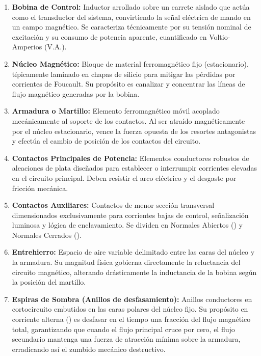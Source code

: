 \begin{enumerate}  
    \item\textbf{Bobina de Control:} Inductor arrollado sobre un carrete aislado que actúa como el transductor del sistema, convirtiendo la señal eléctrica de mando en un campo magnético. Se caracteriza técnicamente por su tensión nominal de excitación y su consumo de potencia aparente, cuantificado en Voltio-Amperios ($\text{V.A.}$).
    
    \item\textbf{Núcleo Magnético:} Bloque de material ferromagnético fijo (estacionario), típicamente laminado en chapas de silicio para mitigar las pérdidas por corrientes de Foucault. Su propósito es canalizar y concentrar las líneas de flujo magnético generadas por la bobina.
    
    \item\textbf{Armadura o Martillo:} Elemento ferromagnético móvil acoplado mecánicamente al soporte de los contactos. Al ser atraído magnéticamente por el núcleo estacionario, vence la fuerza opuesta de los resortes antagonistas y efectúa el cambio de posición de los contactos del circuito.
    
    \item\textbf{Contactos Principales de Potencia:} Elementos conductores robustos de aleaciones de plata diseñados para establecer o interrumpir corrientes elevadas en el circuito principal. Deben resistir el arco eléctrico y el desgaste por fricción mecánica.
    
    \item\textbf{Contactos Auxiliares:} Contactos de menor sección transversal dimensionados exclusivamente para corrientes bajas de control, señalización luminosa y lógica de enclavamiento. Se dividen en Normales Abiertos () y Normales Cerrados ().
    
    \item\textbf{Entrehierro:} Espacio de aire variable delimitado entre las caras del núcleo y la armadura. Su magnitud física gobierna directamente la reluctancia del circuito magnético, alterando drásticamente la inductancia de la bobina según la posición del martillo.
    
    \item\textbf{Espiras de Sombra (Anillos de desfasamiento):} Anillos conductores en cortocircuito embutidos en las caras polares del núcleo fijo. Su propósito en corriente alterna () es desfasar en el tiempo una fracción del flujo magnético total, garantizando que cuando el flujo principal cruce por cero, el flujo secundario mantenga una fuerza de atracción mínima sobre la armadura, erradicando así el zumbido mecánico destructivo.
    

\end{enumerate}
